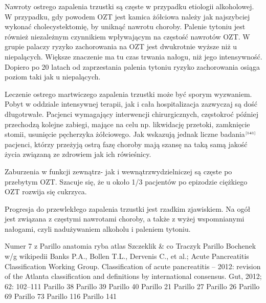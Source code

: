 \documentclass[a4paper, 12pt]{report}
\newcommand\cyt[1]{$^{\tiny{\cite{#1}}}$}
\begin{document}
Nawroty ostrego zapalenia trzustki są częste w przypadku etiologii
alkoholowej. W przypadku, gdy powodem OZT jest kamica żółciowa należy
jak najszybciej wykonać cholecystektomię, by uniknąć nawrotu
choroby. Palenie tytoniu jest również niezależnym czynnikiem wpływającym na
częstość nawrotów OZT. W grupie palaczy ryzyko zachorowania na OZT
jest dwukrotnie wyższe niż u niepalących. Większe znaczenie ma tu czas trwania
nałogu, niż jego intensywność. Dopiero po 20 latach od zaprzestania
palenia tytoniu ryzyko zachorowania osiąga poziom taki jak u
niepalących.

Leczenie ostrego martwiczego zapalenia trzustki może być sporym
wyzwaniem. Pobyt w oddziale intensywnej terapii, jak i cała
hospitalizacja zazwyczaj są dość długotrwałe. Pacjenci wymagający
interwencji chirurgicznych, częstokroć później przechodzą kolejne
zabiegi, mające na celu np. likwidację przetoki, zamknięcie stomii,
usunięcie pęcherzyka żółciowego. Jak wskazują jednak liczne
badania\cyt{141} pacjenci, którzy przeżyją ostrą fazę choroby mają
szansę na taką samą jakość życia związaną ze zdrowiem jak ich
rówieśnicy.

Zaburzenia w funkcji zewnątrz- jak i wewnątrzwydzielniczej są częste
po przebytym OZT. Szacuje się, że u około 1/3 pacjentów po epizodzie
ciężkiego OZT rozwija się cukrzyca.

Progresja do przewlekłego zapalenia trzustki jest rzadkim
zjawiskiem. Na ogół jest związana z częstymi nawrotami choroby, a
także z wyżej wspomnianymi nałogami, czyli nadużywaniem alkoholu i
paleniem tytoniu.


\begin{thebibliography}{99}
 Numer 7 z Parillo
 anatomia
 ryba
 atlas
 Szczeklik \& co
 Traczyk
 Parillo
 Bochenek w/g wikipedii
 Banks P.A., Bollen T.L., Dervenis C., et al.; Acute
  Pancreatitis Classification Working Group. Classification of acute
  pancreatitis – 2012: revision of the Atlanta classification and
  definitions by international consensus. Gut, 2012; 62: 102–111
 Parillo 38
 Parillo 39
 Parillo 40
 Parillo 21
 Parillo 27
 Parillo 26
 Parillo 69
 Parillo 73
 Parillo 116
 Parillo 141
\end{thebibliography}
\end{document}
